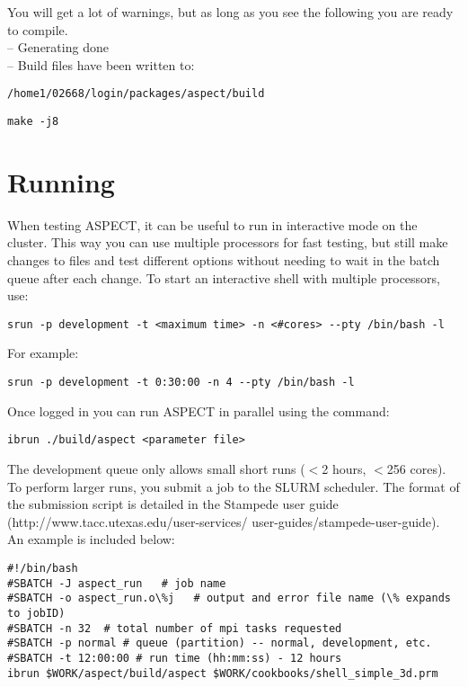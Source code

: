 \documentclass{article}
\newcommand{\aspect}{\textsc{ASPECT}}
\begin{document}
You will get a lot of warnings, but as long as you see the following you are ready to compile. \\
-- Generating done \\
-- Build files have been written to:
\begin{lstlisting}[frame=single,language=ksh]
/home1/02668/login/packages/aspect/build
\end{lstlisting}

\begin{lstlisting}[frame=single,language=ksh]
make -j8 
\end{lstlisting}

\section{Running}
When testing \aspect{}, it can be useful to run in interactive mode on the cluster. This way you can use multiple processors for fast testing, but still make changes to files and test different options without needing to wait in the batch queue after each change. To start an interactive shell with multiple processors, use: 

\begin{lstlisting}[frame=single,language=ksh]
srun -p development -t <maximum time> -n <#cores> --pty /bin/bash -l 
\end{lstlisting}

For example: 
\begin{lstlisting}[frame=single,language=ksh]
srun -p development -t 0:30:00 -n 4 --pty /bin/bash -l 
\end{lstlisting}
 
Once logged in you can run \aspect{} in parallel using the command:
 
\begin{lstlisting}[frame=single,language=ksh]
ibrun ./build/aspect <parameter file> 
\end{lstlisting}
 
The development queue only allows small short runs ($<$2 hours, $<$256 cores). To perform larger runs, you submit a job to the SLURM scheduler. The format of the submission script is detailed in the Stampede user guide (http://www.tacc.utexas.edu/user-services/ user-guides/stampede-user-guide). An example is included below:
\begin{lstlisting}[frame=single,language=ksh]
#!/bin/bash 
#SBATCH -J aspect_run   # job name 
#SBATCH -o aspect_run.o\%j   # output and error file name (\% expands to jobID) 
#SBATCH -n 32  # total number of mpi tasks requested 
#SBATCH -p normal # queue (partition) -- normal, development, etc. 
#SBATCH -t 12:00:00 # run time (hh:mm:ss) - 12 hours 
ibrun $WORK/aspect/build/aspect $WORK/cookbooks/shell_simple_3d.prm 
\end{lstlisting}
\end{document}
